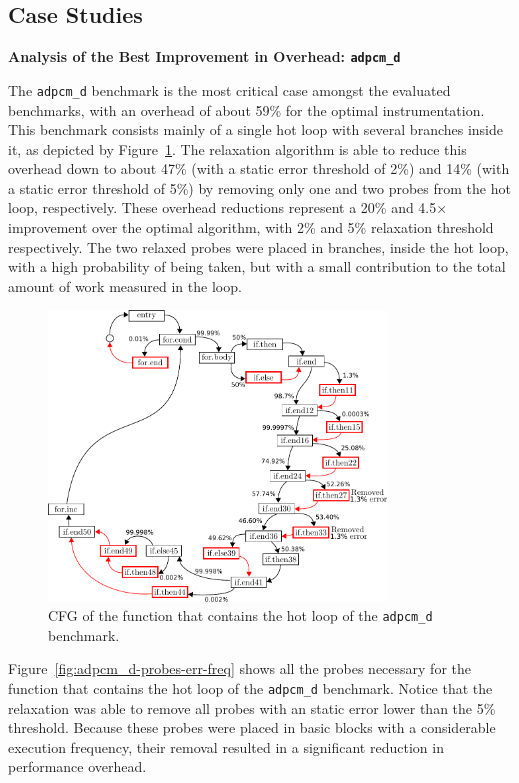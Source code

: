 \subsection{Case Studies}

\noindent \textbf{Analysis of the Best Improvement in Overhead: \texttt{adpcm\_d}}

The \texttt{adpcm\_d} benchmark is the most critical case amongst the evaluated benchmarks, with an overhead of about 59\% for the optimal instrumentation.
This benchmark consists mainly of a single hot loop with several branches inside it, as depicted by Figure~\ref{fig:adpcm_d-cfg-instr}.
The relaxation algorithm is able to reduce this overhead down to about 47\% (with a static error threshold of 2\%) and 14\% (with a static error threshold of 5\%) by removing only one and two probes from the hot loop, respectively.
These overhead reductions represent a 20\% and 4.5$\times$ improvement over the optimal algorithm, with 2\% and 5\% relaxation threshold respectively.
The two relaxed probes were placed in branches, inside the hot loop, with a high probability of being taken, but with a small contribution to the total amount of work measured in the loop.

\begin{figure}[htb]
    \centering
    \includegraphics[width=0.8\textwidth]{figs/adpcm_d-cfg-instr.pdf}
    \caption{CFG of the function that contains the hot loop of the \texttt{adpcm\_d} benchmark.}
    \label{fig:adpcm_d-cfg-instr}
\end{figure}

Figure~\ref{fig:adpcm_d-probes-err-freq} shows all the probes necessary for the function that contains the hot loop of the \texttt{adpcm\_d} benchmark.
Notice that the relaxation was able to remove all probes with an static error lower than the 5\% threshold.
Because these probes were placed in basic blocks with a considerable execution frequency, their removal resulted in a significant reduction in performance overhead.

